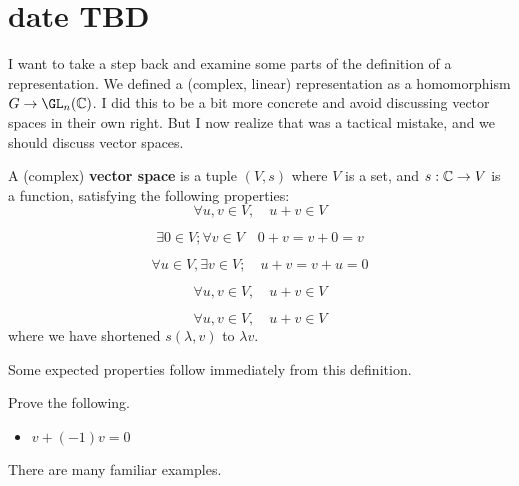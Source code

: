 \section*{date TBD}


I want to take a step back and examine some parts of the definition of a representation.
We defined a (complex, linear) representation as a homomorphism $G\to \GL_n(\C)$.
I did this to be a bit more concrete and avoid discussing vector spaces in their own right.
But I now realize that was a tactical mistake, and we should discuss vector spaces.

\begin{definition}
    A (complex) {\bf vector space} is a tuple $(V, s)$ where $V$ is a set, 
    and $s:\mathbb{C}\to V$ is a function,
    satisfying the following properties:
    \begin{equation*}\tag{Addition}
        \forall u,v\in V, \quad u+v\in V
    \end{equation*}

    \begin{equation*}\tag{Zero}
        \exists 0\in V; \forall v\in V \quad 0+v = v+0 = v
    \end{equation*}

    \begin{equation*}\tag{Negative}
        \forall u\in V, \exists v\in V; \quad u+v = v+u = 0
    \end{equation*}

    \begin{equation*}\tag{Left distribute}
        \forall u,v\in V, \quad u+v\in V
    \end{equation*}

    \begin{equation*}\tag{Right distribute}
        \forall u,v\in V, \quad u+v\in V
    \end{equation*}
    where we have shortened $s(\lambda,v)$ to $\lambda v$.
\end{definition}

Some expected properties follow immediately from this definition.

\begin{exercise}
    Prove the following.
    \begin{itemize}
        \item $v + (-1)v = 0$
    \end{itemize}
\end{exercise}

There are many familiar examples.

\begin{example}
    
\end{example}


\begin{example}[Polynomials]
    
\end{example}